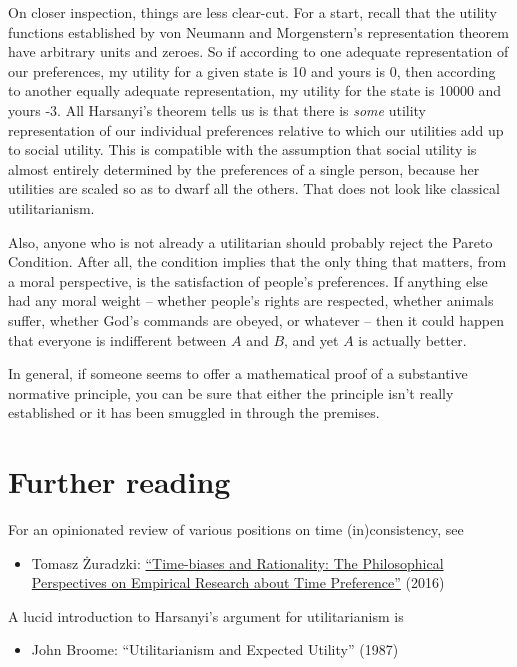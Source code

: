 On closer inspection, things are less clear-cut. For a start, recall
that the utility functions established by von Neumann and
Morgenstern's representation theorem have arbitrary units and
zeroes. So if according to one adequate representation of our
preferences, my utility for a given state is 10 and yours is 0, then
according to another equally adequate representation, my utility for
the state is 10000 and yours -3. All Harsanyi's theorem tells us is
that there is \emph{some} utility representation of our individual
preferences relative to which our utilities add up to social
utility. This is compatible with the assumption that social utility is
almost entirely determined by the preferences of a single person,
because her utilities are scaled so as to dwarf all the others. That
does not look like classical utilitarianism.

Also, anyone who is not already a utilitarian should probably reject
the Pareto Condition. After all, the condition implies that the only
thing that matters, from a moral perspective, is the satisfaction of
people's preferences. If anything else had any moral weight -- whether
people's rights are respected, whether animals suffer, whether God's
commands are obeyed, or whatever -- then it could happen that everyone
is indifferent between $A$ and $B$, and yet $A$ is actually better.


In general, if someone seems to offer a mathematical proof
of a substantive normative principle, you can be sure that either the
principle isn't really established or it has been smuggled in through
the premises. 


\section{Further reading}

For an opinionated review of various positions on time (in)consistency, see
\begin{itemize}
\item Tomasz Żuradzki: \href{https://philpapers.org/archive/URATAR.pdf}{``Time-biases  and  Rationality:  The Philosophical  Perspectives  on  Empirical Research  about  Time  Preference''} (2016)
\end{itemize}

A lucid introduction to Harsanyi's argument for utilitarianism is
\begin{itemize}
\item John Broome: ``Utilitarianism and Expected Utility'' (1987)
\end{itemize}

